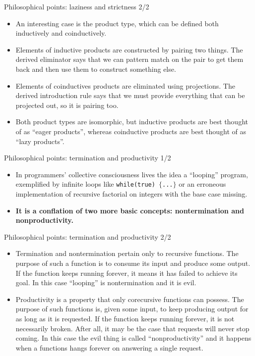 \documentclass{beamer}
\begin{document}
\begin{frame}{Philosophical points: laziness and strictness 2/2}
\begin{itemize}
	\item An interesting case is the product type, which can be defined both inductively and coinductively.
	\item Elements of inductive products are constructed by pairing two things. The derived eliminator says that we can pattern match on the pair to get them back and then use them to construct something else.
	\item Elements of coinductives products are eliminated using projections. The derived introduction rule says that we must provide everything that can be projected out, so it is pairing too.
	\item Both product types are isomorphic, but inductive products are best thought of as ``eager products'', whereas coinductive products are best thought of as ``lazy products''.
\end{itemize}
\end{frame}

\begin{frame}{Philosophical points: termination and productivity 1/2}
\begin{itemize}
	\item In programmers' collective consciousness lives the idea a ``looping'' program, exemplified by infinite loops like \texttt{while(true) $\lbrace$...$\rbrace$} or an erroneous implementation of recursive factorial on integers with the base case missing.
	\item \textbf{It is a conflation of two more basic concepts: nontermination and nonproductivity.}
\end{itemize}
\end{frame}

\begin{frame}{Philosophical points: termination and productivity 2/2}
\begin{itemize}
	\item Termination and nontermination pertain only to recursive functions. The purpose of such a function is to consume its input and produce some output. If the function keeps running forever, it means it has failed to achieve its goal. In this case ``looping'' is nontermination and it is evil.
	\item Productivity is a property that only corecursive functions can possess. The purpose of such functions is, given some input, to keep producing output for as long as it is requested. If the function keeps running forever, it is not necessarily broken. After all, it may be the case that requests will never stop coming. In this case the evil thing is called ``nonproductivity'' and it happens when a functions hangs forever on answering a single request.
\end{itemize}
\end{frame}
\end{document}
